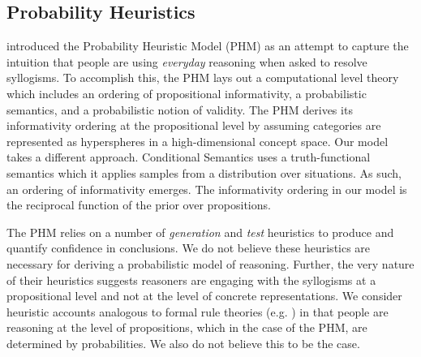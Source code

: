 \documentclass[10pt,letterpaper]{article}
\begin{document}
%

\subsection{Probability Heuristics}

\cite{Chater1999} introduced the Probability Heuristic Model (PHM) as an attempt to capture the intuition that people are using \emph{everyday} reasoning when asked to resolve syllogisms. To accomplish this, the PHM lays out a computational level theory which includes an ordering of propositional informativity, a probabilistic semantics, and a probabilistic notion of validity. The PHM derives its informativity ordering at the propositional level by assuming categories are represented as hyperspheres in a high-dimensional concept space. Our model takes a different approach. Conditional Semantics uses a truth-functional semantics which it applies samples from a distribution over situations. As such, an ordering of informativity emerges. The informativity ordering in our model is the reciprocal function of the prior over propositions. 

The PHM relies on a number of {\em generation} and {\em test} heuristics to produce and quantify confidence in conclusions. We do not believe these heuristics are necessary for deriving a probabilistic model of reasoning. Further, the very nature of their heuristics suggests reasoners are engaging with the syllogisms at a propositional level and not at the level of concrete representations. We consider heuristic accounts analogous to formal rule theories (e.g. \cite{rips1994}) in that people are reasoning at the level of propositions, which in the case of the PHM, are determined by probabilities. We also do not believe this to be the case.
\end{document}
